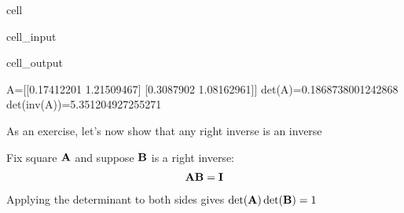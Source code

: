 \documentclass[letterpaper,10pt,english]{jupyterBook}
\begin{document}
\begin{sphinxuseclass}{cell}\begin{sphinxVerbatimInput}

\begin{sphinxuseclass}{cell_input}
\begin{sphinxVerbatim}[commandchars=\\\{\}]
   
    
\end{sphinxVerbatim}

\end{sphinxuseclass}\end{sphinxVerbatimInput}
\begin{sphinxVerbatimOutput}

\begin{sphinxuseclass}{cell_output}
\begin{sphinxVerbatim}[commandchars=\\\{\}]
A=[[\PYGZhy{}0.17412201  1.21509467]
 [\PYGZhy{}0.3087902   1.08162961]]
det(A)=0.1868738001242868
det(inv(A))=5.351204927255271
\end{sphinxVerbatim}

\end{sphinxuseclass}\end{sphinxVerbatimOutput}

\end{sphinxuseclass}
\sphinxAtStartPar
As an exercise, let’s now show that any right inverse is an inverse

\sphinxAtStartPar
Fix square \({\bf A}\) and suppose \({\bf B}\) is a right inverse:
\begin{equation}\label{equation:05.linear_algebra:eq:ud}
\begin{split}
%
{\bf A} {\bf B} = {\bf I}
%
\end{split}
\end{equation}
\sphinxAtStartPar
Applying the determinant to both sides gives \(\det({\bf A}) \det({\bf B}) = 1\)
\end{document}
